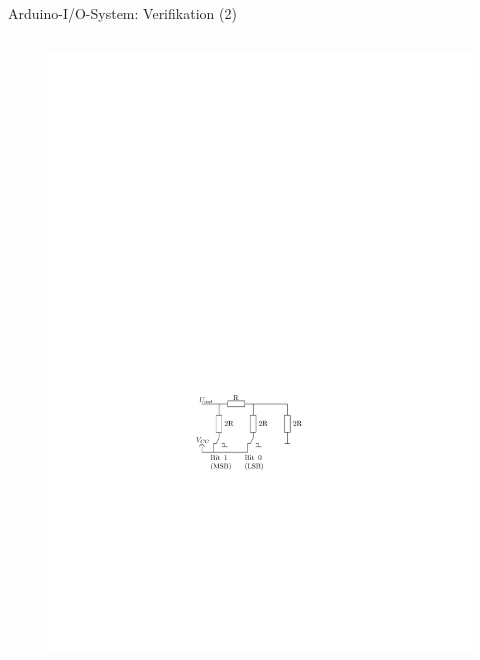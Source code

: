 \documentclass{beamer}
\begin{document}
\begin{frame}{Arduino-I/O-System: Verifikation (2)}
\begin{columns}
\begin{column}{0.4\textwidth}
			\begin{figure}[htbp]
				\centering
				\includegraphics[scale=0.6]{./images/arduinoio-r2r-network.pdf}
			\end{figure}
		\end{column}
	\end{columns}
\end{frame}
\end{document}
